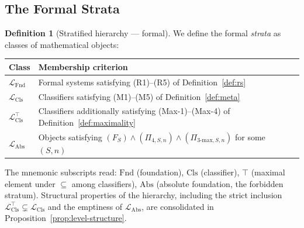 \documentclass[11pt]{article}
\theoremstyle{plain}
\theoremstyle{definition}
\newtheorem{definition}[theorem]{Definition}
\newcommand{\LFnd}{\mathcal{L}_{\mathrm{Fnd}}}
\newcommand{\LCls}{\mathcal{L}_{\mathrm{Cls}}}
\newcommand{\LClsMax}{\mathcal{L}_{\mathrm{Cls}}^{\top}}
\newcommand{\LAbs}{\mathcal{L}_{\mathrm{Abs}}}
\begin{document}
\subsection{The Formal Strata}

\begin{definition}[Stratified hierarchy --- formal]\label{def:hierarchy}
We define the formal \emph{strata} as classes of mathematical objects:

\begin{tabular}{@{}ll@{}}
\toprule
Class & Membership criterion \\ \midrule
$\LFnd$ & Formal systems satisfying (R1)--(R5) of Definition~\ref{def:rs} \\
$\LCls$ & Classifiers satisfying (M1)--(M5) of Definition~\ref{def:meta} \\
$\LClsMax$ & Classifiers additionally satisfying (Max-1)--(Max-4) of Definition~\ref{def:maximality} \\
$\LAbs$ & Objects satisfying $(F_S) \wedge (\Pi_{4, S, n}) \wedge (\Pi_{3\text{-max}, S, n})$ for some $(S, n)$ \\
\bottomrule
\end{tabular}
\end{definition}

The mnemonic subscripts read: $\mathrm{Fnd}$ (foundation), $\mathrm{Cls}$ (classifier), $\top$ (maximal element under $\subseteq$ among classifiers), $\mathrm{Abs}$ (absolute foundation, the forbidden stratum). Structural properties of the hierarchy, including the strict inclusion $\LClsMax \subsetneq \LCls$ and the emptiness of $\LAbs$, are consolidated in Proposition~\ref{prop:level-structure}.
\end{document}
